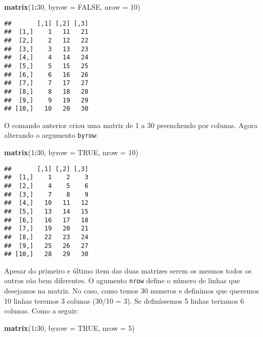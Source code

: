\documentclass[]{book}
\newenvironment{Shaded}{\begin{snugshade}}{\end{snugshade}}
\newcommand{\DataTypeTok}[1]{\textcolor[rgb]{0.13,0.29,0.53}{#1}}
\newcommand{\DecValTok}[1]{\textcolor[rgb]{0.00,0.00,0.81}{#1}}
\newcommand{\KeywordTok}[1]{\textcolor[rgb]{0.13,0.29,0.53}{\textbf{#1}}}
\newcommand{\NormalTok}[1]{#1}
\newcommand{\OperatorTok}[1]{\textcolor[rgb]{0.81,0.36,0.00}{\textbf{#1}}}
\newcommand{\OtherTok}[1]{\textcolor[rgb]{0.56,0.35,0.01}{#1}}
\theoremstyle{definition}
\theoremstyle{definition}
\theoremstyle{definition}
\theoremstyle{remark}
\begin{document}
\begin{Shaded}
\begin{Highlighting}[]
\KeywordTok{matrix}\NormalTok{(}\DecValTok{1}\OperatorTok{:}\DecValTok{30}\NormalTok{, }\DataTypeTok{byrow =} \OtherTok{FALSE}\NormalTok{, }\DataTypeTok{nrow =} \DecValTok{10}\NormalTok{) }
\end{Highlighting}
\end{Shaded}

\begin{verbatim}
##       [,1] [,2] [,3]
##  [1,]    1   11   21
##  [2,]    2   12   22
##  [3,]    3   13   23
##  [4,]    4   14   24
##  [5,]    5   15   25
##  [6,]    6   16   26
##  [7,]    7   17   27
##  [8,]    8   18   28
##  [9,]    9   19   29
## [10,]   10   20   30
\end{verbatim}

O comando anterior criou uma matriz de 1 a 30 preenchendo por colunas. Agora alterando o argumento \texttt{byrow}:

\begin{Shaded}
\begin{Highlighting}[]
\KeywordTok{matrix}\NormalTok{(}\DecValTok{1}\OperatorTok{:}\DecValTok{30}\NormalTok{, }\DataTypeTok{byrow =} \OtherTok{TRUE}\NormalTok{, }\DataTypeTok{nrow =} \DecValTok{10}\NormalTok{)}
\end{Highlighting}
\end{Shaded}

\begin{verbatim}
##       [,1] [,2] [,3]
##  [1,]    1    2    3
##  [2,]    4    5    6
##  [3,]    7    8    9
##  [4,]   10   11   12
##  [5,]   13   14   15
##  [6,]   16   17   18
##  [7,]   19   20   21
##  [8,]   22   23   24
##  [9,]   25   26   27
## [10,]   28   29   30
\end{verbatim}

Apesar do primeiro e último item das duas matrizes serem os mesmos todos os outros são bem diferentes. O agumento \texttt{nrow} define o número de linhas que desejamos na matriz. No caso, como temos 30 numeros e definimos que queremos 10 linhas teremos 3 colunas (30/10 = 3). Se definíssemos 5 linhas teriamos 6 colunas. Como a seguir:

\begin{Shaded}
\begin{Highlighting}[]
\KeywordTok{matrix}\NormalTok{(}\DecValTok{1}\OperatorTok{:}\DecValTok{30}\NormalTok{, }\DataTypeTok{byrow =} \OtherTok{TRUE}\NormalTok{, }\DataTypeTok{nrow =} \DecValTok{5}\NormalTok{)}
\end{Highlighting}
\end{Shaded}
\end{document}
